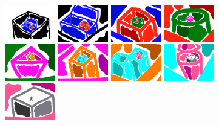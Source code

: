 \documentclass[review]{acmsiggraph}
\begin{document}
\begin{figure}
    \centering
        \includegraphics[width=0.195\textwidth]{images/zoom61}
        \includegraphics[width=0.195\textwidth]{images/zoom62}
        \includegraphics[width=0.195\textwidth]{images/zoom63}
        \includegraphics[width=0.195\textwidth]{images/zoom64}
        \includegraphics[width=0.195\textwidth]{images/zoom65}
        \includegraphics[width=0.195\textwidth]{images/zoom66}
        \includegraphics[width=0.195\textwidth]{images/zoom67}
        \includegraphics[width=0.195\textwidth]{images/zoom68}
        \includegraphics[width=0.195\textwidth]{images/zoom69}

\end{figure}
\end{document}
